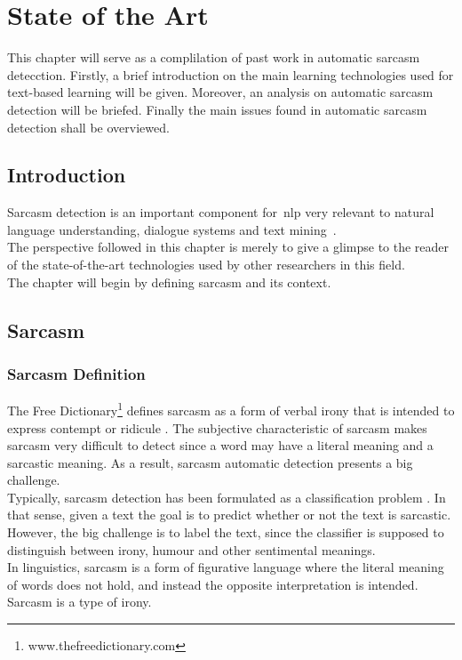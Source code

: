 \chapter{State of the Art}
\label{chap:enabling_technologies}
This chapter will serve as a complilation of past work in automatic sarcasm detecction.
Firstly, a brief introduction on the main learning technologies used for text-based learning will be given. Moreover, an analysis on automatic sarcasm detection will be briefed. Finally the main issues found in automatic sarcasm detection shall be overviewed.

\section{Introduction}
Sarcasm detection is an important component for~\ac{nlp} very relevant to natural language understanding, dialogue systems and text mining~\cite{khodak2017large}.\\ The perspective followed in this chapter is merely to give a glimpse to the reader of the state-of-the-art technologies used by other researchers in this field. \\
The chapter will begin by defining sarcasm and its context. 
\section{Sarcasm} 
\subsection{Sarcasm Definition~\cite{joshi2017automatic}}
The Free Dictionary\footnote{www.thefreedictionary.com} defines sarcasm as a form of verbal irony that is intended to express contempt or ridicule . The subjective characteristic of sarcasm makes sarcasm very difficult to detect since a word may have a literal meaning and a sarcastic meaning. As a result, sarcasm automatic detection presents a big challenge. \\
Typically, sarcasm detection has been formulated as a classification problem . In that sense, given a text the goal is to predict whether or not the text is sarcastic. However, the big challenge is to label the text, since the classifier is supposed to distinguish between irony,  humour and other sentimental meanings.\\
In linguistics, sarcasm is a form of figurative language where the literal meaning of words does not hold, and instead the opposite interpretation is intended. Sarcasm is a type of irony. 

